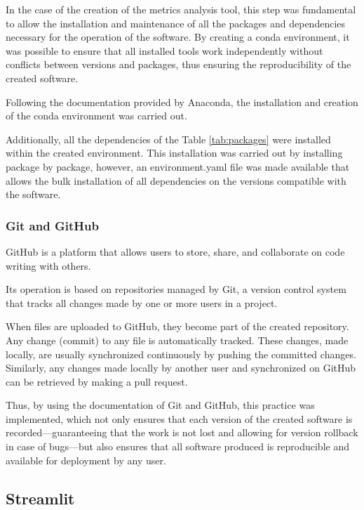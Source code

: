 In the case of the creation of the metrics analysis tool, this step was fundamental to allow the installation and maintenance of all the packages and dependencies necessary for the operation of the software. By creating a conda environment, it was possible to ensure that all installed tools work independently without conflicts between versions and packages, thus ensuring the reproducibility of the created software. \cite{anaconda2}

Following the documentation provided by Anaconda, the installation and creation of the conda environment was carried out. \cite{anaconda3} 

Additionally, all the dependencies of the Table \ref{tab:packages} were installed within the created environment. This installation was carried out by installing package by package, however, an environment.yaml file was made available that allows the bulk installation \cite{anaconda4} of all dependencies on the versions compatible with the software.

\subsubsection{\textbf{Git and GitHub}}

GitHub is a platform that allows users to store, share, and collaborate on code writing with others. \cite{github}

Its operation is based on repositories managed by Git, a version control system that tracks all changes made by one or more users in a project. \cite{github}

When files are uploaded to GitHub, they become part of the created repository. Any change (commit) to any file is automatically tracked. These changes, made locally, are usually synchronized continuously by pushing the committed changes. Similarly, any changes made locally by another user and synchronized on GitHub can be retrieved by making a pull request. \cite{github}

Thus, by using the documentation of Git and GitHub, this practice was implemented, which not only ensures that each version of the created software is recorded—guaranteeing that the work is not lost and allowing for version rollback in case of bugs—but also ensures that all software produced is reproducible and available for deployment by any user. \cite{github}

\subsection{Streamlit}

